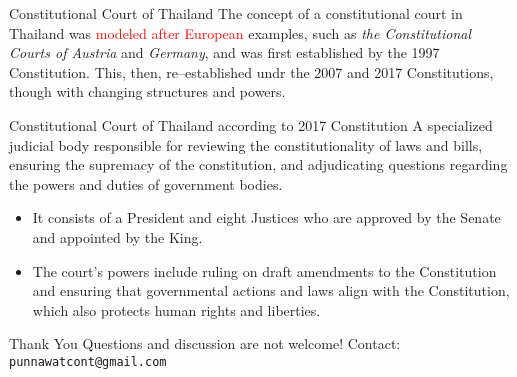 \documentclass[aspectratio=169]{beamer}
\begin{document}
\begin{frame}{Constitutional Court of Thailand}
	The concept of a constitutional court in Thailand was \textcolor{red}{modeled after European}
examples, such as \textit{the Constitutional Courts of Austria} and \textit{Germany}, and was first
established by the 1997 Constitution. This, then, re–established undr the 2007 and 2017
Constitutions, though with changing structures and powers.
\end{frame}

\begin{frame}{Constitutional Court of Thailand according to 2017 Constitution}
	A specialized judicial body responsible for reviewing the constitutionality of laws and
bills, ensuring the supremacy of the constitution, and adjudicating questions regarding the
powers and duties of government bodies.
	\begin{itemize}
		\item It consists of a President and eight Justices who are approved by the Senate and
appointed by the King.
		\item The court’s powers include ruling on draft amendments to the Constitution and
ensuring that governmental actions and laws align with the Constitution, which also
protects human rights and liberties.
	\end{itemize}
\end{frame}
\begin{frame}{Thank You}
  Questions and discussion are not welcome!  
  \vspace{1em}
  Contact: \texttt{punnawatcont@gmail.com}
\end{frame}
\end{document}
